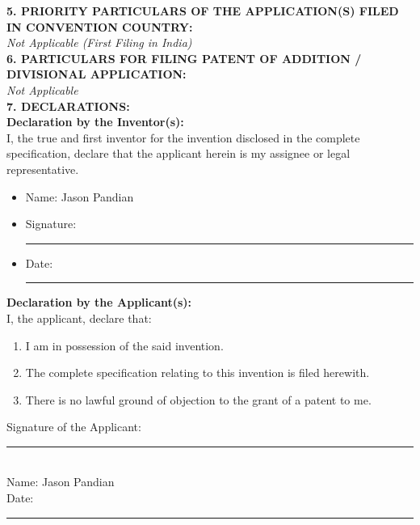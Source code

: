 \documentclass[12pt,a4paper]{article}
\begin{document}
\noindent \textbf{5. PRIORITY PARTICULARS OF THE APPLICATION(S) FILED IN CONVENTION COUNTRY:} \\
\textit{Not Applicable (First Filing in India)} \\

\noindent \textbf{6. PARTICULARS FOR FILING PATENT OF ADDITION / DIVISIONAL APPLICATION:} \\
\textit{Not Applicable} \\

\noindent \textbf{7. DECLARATIONS:} \\
\textbf{Declaration by the Inventor(s):} \\
I, the true and first inventor for the invention disclosed in the complete specification, declare that the applicant herein is my assignee or legal representative.
\begin{itemize}
    \item Name: Jason Pandian
    \item Signature: \rule{4cm}{0.4pt}
    \item Date: \rule{4cm}{0.4pt}
\end{itemize}

\noindent \textbf{Declaration by the Applicant(s):} \\
I, the applicant, declare that:
\begin{enumerate}
    \item I am in possession of the said invention.
    \item The complete specification relating to this invention is filed herewith.
    \item There is no lawful ground of objection to the grant of a patent to me.
\end{enumerate}

\vspace{1cm}
\noindent Signature of the Applicant: \rule{5cm}{0.4pt} \\
Name: Jason Pandian \\
Date: \rule{5cm}{0.4pt}
\end{document}
